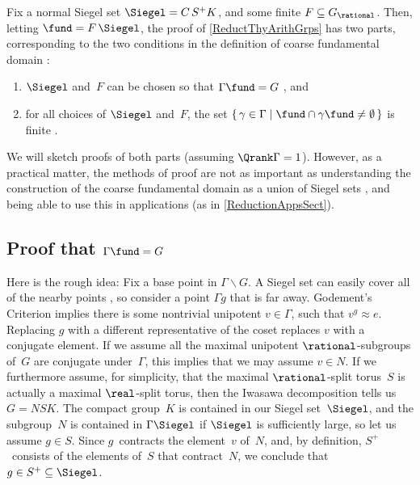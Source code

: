 Fix a normal Siegel set $\Siegel = C \, S^+ K$, and some finite $F \subseteq G_\rational$. Then, letting $\fund = F \, \Siegel$, the proof of \cref{ReductThyArithGrps} has two parts, corresponding to the two conditions in the definition of coarse fundamental domain :
	\begin{enumerate} \renewcommand{\theenumi}{\roman{enumi}}
	\item $\Siegel$ and~$F$ can be chosen so that $\Gamma \fund = G$ , 
	and
	\item for all choices of $\Siegel$ and~$F$, the set 
		$\{\, \gamma \in \Gamma \mid \fund \cap \gamma \fund \neq \emptyset \,\}$ is finite .
	\end{enumerate}
We will sketch proofs of both parts (assuming $\Qrank \Gamma = 1$).
However, as a practical matter, the methods of proof are not as important as understanding the construction of the coarse fundamental domain as a union of Siegel sets , and being able to use this in applications (as in \cref{ReductionAppsSect}). 

\subsection{Proof that $\Gamma \fund = G$}
Here is the rough idea: Fix a base point in $\Gamma \backslash G$.  A Siegel set can easily cover all of the nearby points , so consider a point $\Gamma g$ that is far away. Godement's Criterion  implies there is some nontrivial unipotent $v \in \Gamma$, such that $v^g \approx e$. Replacing $g$ with a different representative of the coset replaces $v$ with a conjugate element. If we assume all the maximal unipotent $\rational$-subgroups of~$G$ are conjugate under~$\Gamma$, this implies that we may assume $v \in N$. If we furthermore assume, for simplicity, that the maximal $\rational$-split torus~$S$ is actually a maximal $\real$-split torus, then the Iwasawa decomposition  tells us $G = NSK$. The compact group~$K$ is contained in our Siegel set~$\Siegel$, and the subgroup~$N$ is contained in $\Gamma \Siegel$ if $\Siegel$ is sufficiently large, so let us assume $g \in S$. Since $g$~contracts the element~$v$ of~$N$, and, by definition, $S^+$~consists of the elements of~$S$ that contract~$N$, we conclude that $g \in S^+ \subseteq \Siegel$.

\medbreak

